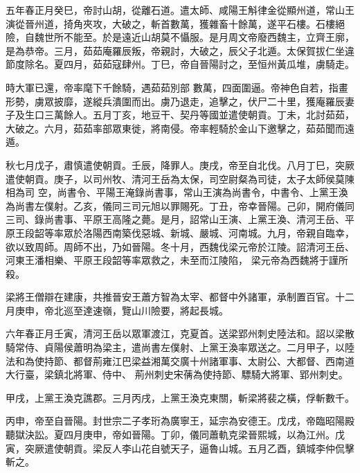 \begin{pinyinscope}
 五年春正月癸巳，帝討山胡，從離石道。遣太師、咸陽王斛律金從顯州道，常山王演從晉州道，掎角夾攻，大破之，斬首數萬，獲雜畜十餘萬，遂平石樓。石樓絕險，自魏世所不能至。於是遠近山胡莫不懾服。是月周文帝廢西魏主，立齊王廓，是為恭帝。三月，茹茹庵羅辰叛，帝親討，大破之，辰父子北遁。太保賀拔仁坐違節度除名。夏四月，茹茹寇肆州。丁巳，帝自晉陽討之，至恒州黃瓜堆，虜騎走。



 時大軍已還，帝率麾下千餘騎，遇茹茹別部
 數萬，四面圍逼。帝神色自若，指畫形勢，虜眾披靡，遂縱兵潰圍而出。虜乃退走，追擊之，伏尸二十里，獲庵羅辰妻子及生口三萬餘人。五月丁亥，地豆干、契丹等國並遣使朝貢。丁未，北討茹茹，大破之。六月，茹茹率部眾東徙，將南侵。帝率輕騎於金山下邀擊之，茹茹聞而遠遁。



 秋七月戊子，肅慎遣使朝貢。壬辰，降罪人。庚戌，帝至自北伐。八月丁巳，突厥遣使朝貢。庚子，以司州牧、清河王岳為太保，司空尉粲為司徒，太子太師侯莫陳相為司
 空，尚書令、平陽王淹錄尚書事，常山王演為尚書令，中書令、上黨王渙為尚書左僕射。乙亥，儀同三司元旭以罪賜死。丁丑，帝幸晉陽。己卯，開府儀同三司、錄尚書事、平原王高隆之薨。是月，詔常山王演、上黨王渙、清河王岳、平原王段韶等率眾於洛陽西南築伐惡城、新城、嚴城、河南城。九月，帝親自臨幸，欲以致周師。周師不出，乃如晉陽。冬十月，西魏伐梁元帝於江陵。詔清河王岳、河東王潘相樂、平原王段韶等率眾救之，未至而江陵陷，
 梁元帝為西魏將于謹所殺。



 梁將王僧辯在建康，共推晉安王蕭方智為太宰、都督中外諸軍，承制置百官。十二月庚申，帝北巡至達速嶺，覽山川險要，將起長城。



 六年春正月壬寅，清河王岳以眾軍渡江，克夏首。送梁郢州刺史陸法和。詔以梁散騎常侍、貞陽侯蕭明為梁主，遣尚書左僕射、上黨王渙率眾送之。二月甲子，以陸法和為使持節、都督荊雍江巴梁益湘萬交廣十州諸軍事、太尉公、大都督、西南道大行臺，梁鎮北將軍、侍中、
 荊州刺史宋蒨為使持節、驃騎大將軍、郢州刺史。



 甲戌，上黨王渙克譙郡。三月丙戌，上黨王渙克東關，斬梁將裴之橫，俘斬數千。



 丙申，帝至自晉陽。封世宗二子孝珩為廣寧王，延宗為安德王。戊戌，帝臨昭陽殿聽獄決訟。夏四月庚申，帝如晉陽。丁卯，儀同蕭軌克梁晉熙城，以為江州。戊寅，突厥遣使朝貢。梁反人李山花自號天子，逼魯山城。五月乙酉，鎮城李仲侃擊斬之。




\end{pinyinscope}
